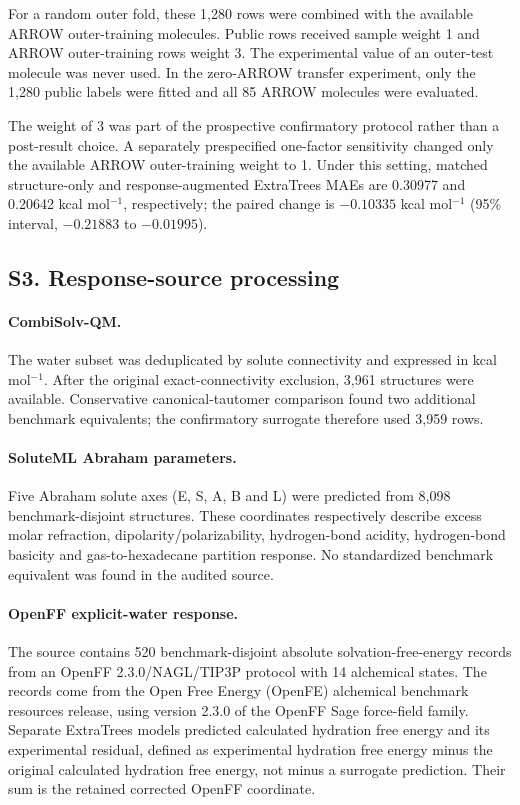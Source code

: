 For a random outer fold, these 1,280 rows were combined with the available ARROW
outer-training molecules. Public rows received sample weight 1 and ARROW
outer-training rows weight 3. The experimental value of an outer-test molecule was
never used. In the zero-ARROW transfer experiment, only the 1,280 public labels
were fitted and all 85 ARROW molecules were evaluated.

The weight of 3 was part of the prospective confirmatory protocol rather than a
post-result choice. A separately prespecified one-factor sensitivity changed only the
available ARROW outer-training weight to 1. Under this setting, matched structure-only
and response-augmented ExtraTrees MAEs are 0.30977 and 0.20642 kcal mol$^{-1}$, respectively; the paired
change is $-0.10335$ kcal mol$^{-1}$ (95\% interval, $-0.21883$ to $-0.01995$).

\subsection*{S3. Response-source processing}

\paragraph{CombiSolv-QM.}
The water subset was deduplicated by solute connectivity and expressed in kcal
mol$^{-1}$. After the original exact-connectivity exclusion, 3,961 structures were
available. Conservative canonical-tautomer comparison found two additional
benchmark equivalents; the confirmatory surrogate therefore used 3,959 rows.

\paragraph{SoluteML Abraham parameters.}
Five Abraham solute axes (E, S, A, B and L) were predicted from 8,098
benchmark-disjoint structures. These coordinates respectively describe excess molar
refraction, dipolarity/polarizability, hydrogen-bond acidity, hydrogen-bond basicity
and gas-to-hexadecane partition response. No standardized benchmark equivalent was
found in the audited source.

\paragraph{OpenFF explicit-water response.}
The source contains 520 benchmark-disjoint absolute solvation-free-energy records
from an OpenFF 2.3.0/NAGL/TIP3P protocol with 14 alchemical states. The records
come from the Open Free Energy (OpenFE) alchemical benchmark resources release,\cite{openffdata2026}
using version 2.3.0 of the OpenFF Sage force-field family.\cite{openffsage2023} Separate
ExtraTrees models predicted calculated hydration free energy and its experimental
residual, defined as experimental hydration free energy minus the original
calculated hydration free energy, not minus a surrogate prediction. Their sum
is the retained corrected OpenFF coordinate.

